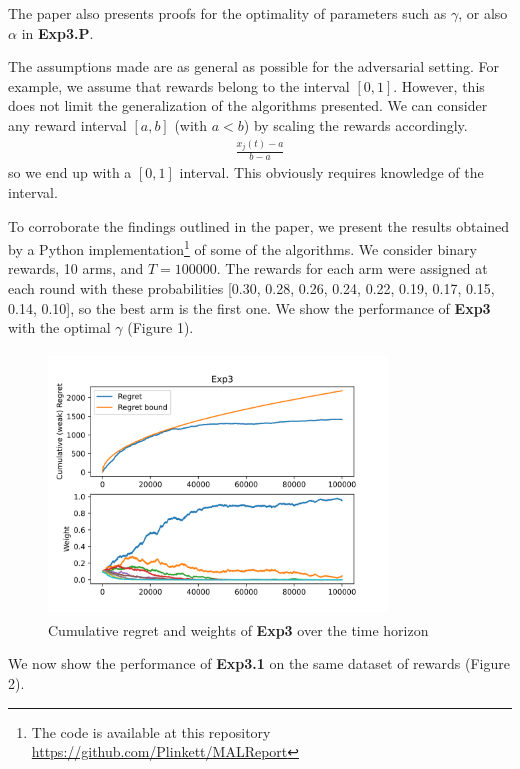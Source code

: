 \documentclass[12pt,a4paper]{article}
\begin{document}
The paper also presents proofs for the optimality of parameters such as $\gamma$, or also $\alpha$ in \textbf{Exp3.P}. 

The assumptions made are as general as possible for the adversarial setting. For example, we assume that rewards belong to the interval $[0,1]$. However, this does not limit the generalization of the algorithms presented. We can consider any reward interval $[a,b]$ (with $a < b$) by scaling the rewards accordingly.
\begin{align*}
	\frac{x_j(t) - a }{b - a}
\end{align*}  
so we end up with a $[0,1]$ interval. This obviously requires knowledge of the interval.

To corroborate the findings outlined in the paper, we present the results obtained by a Python implementation\footnote{The code is available at this repository \url{https://github.com/Plinkett/MALReport}} of some of the algorithms.
We consider binary rewards, 10 arms, and $T = 100000$. The rewards for each arm were assigned at each round with these probabilities [0.30, 0.28, 0.26, 0.24, 0.22, 0.19, 0.17, 0.15, 0.14, 0.10], so the best arm is the first one. We show the performance of \textbf{Exp3} with the optimal $\gamma$ (Figure 1).

\begin{figure}[!htb]
	\begin{center}
		\includegraphics[width=90mm, height=70mm]{exp3optimal.png}
		\caption{Cumulative regret and weights of \textbf{Exp3} over the time horizon}
	\end{center}
\end{figure}

We now show the performance of \textbf{Exp3.1} on the same dataset of rewards (Figure 2). 
\end{document}

